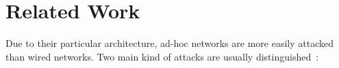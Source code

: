 \documentclass[compsoc, conference, letterpaper, 10pt, times]{IEEEtran}
\begin{document}




\section{Related Work}\label{sec:related}


Due to their particular architecture, ad-hoc networks are more easily attacked than wired networks. Two main kind of attacks are usually distinguished~\cite[p.956]{survey3}:
\end{document}
